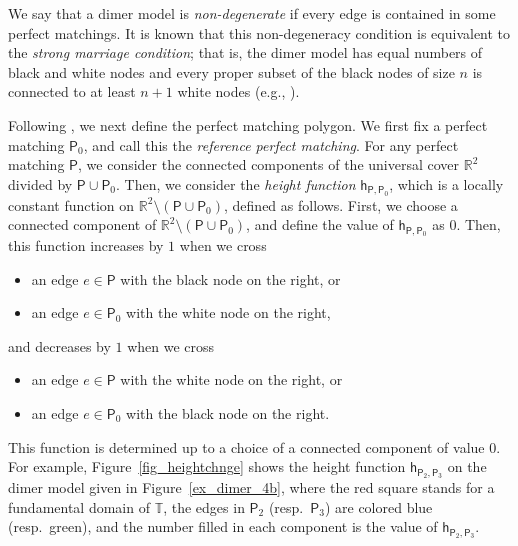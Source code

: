 \documentclass[11pt]{article}
\numberwithin{equation}{section}
\numberwithin{equation}{section}
\numberwithin{figure}{section}
\numberwithin{table}{section}
\newcommand{\RR}{\mathbb{R}}
\newcommand{\TT}{\mathbb{T}}
\newcommand{\sfh}{\mathsf{h}}
\newcommand{\sfP}{\mathsf{P}}
\begin{document}
We say that a dimer model is \emph{non-degenerate} if every edge is contained in some perfect matchings.
It is known that this non-degeneracy condition is equivalent to the \emph{strong marriage condition}; that is, the dimer model has equal numbers of black and white nodes and every proper subset of the black nodes of size $n$ is connected to at least $n+1$ white nodes (e.g., \cite[Remark~2.12]{Bro}).

Following \cite[Section~5]{IU2}, we next define the perfect matching polygon.
We first fix a perfect matching $\sfP_0$, and call this the \emph{reference perfect matching}.
For any perfect matching $\sfP$, we consider the connected components of the universal cover $\RR^2$ divided by $\sfP\cup\sfP_0$.
Then, we consider the \emph{height function} $\sfh_{\sfP,\sfP_0}$, which is a locally constant function on $\RR^2{\setminus}(\sfP\cup\sfP_0)$, defined as follows.
First, we choose a connected component of $\RR^2{\setminus}(\sfP\cup\sfP_0)$, and define the value of $\sfh_{\sfP,\sfP_0}$ as $0$.
Then, this function increases by $1$ when we cross
\begin{itemize}\itemsep=0pt
\item[--] an edge $e\in\sfP$ with the black node on the right, or
\item[--] an edge $e\in\sfP_0$ with the white node on the right,
\end{itemize}
and decreases by $1$
when we cross
\begin{itemize}\itemsep=0pt
\item[--] an edge $e\in\sfP$ with the white node on the right, or
\item[--] an edge $e\in\sfP_0$ with the black node on the right.
\end{itemize}
This function is determined up to a choice of a connected component of value $0$.
For example, Figure~\ref{fig_heightchnge} shows the height function $\sfh_{\sfP_2,\sfP_3}$ on the dimer model given in Figure~\ref{ex_dimer_4b},
where the red square stands for a fundamental domain of $\TT$, the edges in $\sfP_2$ (resp.~$\sfP_3$) are colored blue (resp.\ green),
and the number filled in each component is the value of $\sfh_{\sfP_2,\sfP_3}$.
\end{document}
